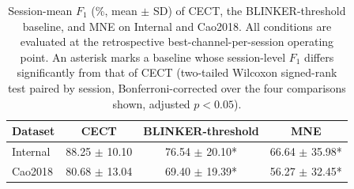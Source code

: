 \begin{table}[ht]
  \centering
  \caption{Session-mean $F_1$ (\%, mean $\pm$ SD) of CECT, the BLINKER-threshold baseline, and MNE on Internal and Cao2018. All conditions are evaluated at the retrospective best-channel-per-session operating point. An asterisk marks a baseline whose session-level $F_1$ differs significantly from that of CECT (two-tailed Wilcoxon signed-rank test paired by session, Bonferroni-corrected over the four comparisons shown, adjusted $p < 0.05$).}
  \label{tab:f1_significance}
  \begin{tabular}{lccc}
    \toprule

    Dataset & CECT & BLINKER-threshold & MNE \\
    \midrule
    Internal & 88.25 $\pm$ 10.10 & 76.54 $\pm$ 20.10* & 66.64 $\pm$ 35.98* \\
    Cao2018 & 80.68 $\pm$ 13.04 & 69.40 $\pm$ 19.39* & 56.27 $\pm$ 32.45* \\
    \bottomrule
  \end{tabular}
\end{table}
